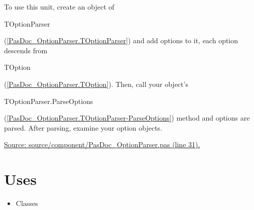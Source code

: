 \documentclass{report}
\begin{document}
 

To use this unit, create an object of \begin{ttfamily}TOptionParser\end{ttfamily}(\ref{PasDoc_OptionParser.TOptionParser}) and add options to it, each option descends from \begin{ttfamily}TOption\end{ttfamily}(\ref{PasDoc_OptionParser.TOption}). Then, call your object's \begin{ttfamily}TOptionParser.ParseOptions\end{ttfamily}(\ref{PasDoc_OptionParser.TOptionParser-ParseOptions}) method and options are parsed. After parsing, examine your option objects.\par
\href{https://github.com/pasdoc/pasdoc/blob/master/source/component/PasDoc_OptionParser.pas#L31}{Source: source/component/PasDoc{\_}OptionParser.pas (line 31).}
\section{Uses}
\begin{itemize}
\item \begin{ttfamily}Classes\end{ttfamily}\end{itemize}
\end{document}
